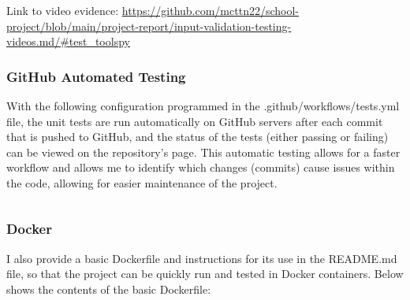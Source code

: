 \documentclass[./project-report/src/latex/project-report.tex]{subfiles}
\begin{document}
\begin{itemize}
\begin{itemize}
\begin{itemize}
						\pagebreak

						\begin{figure}[h!]
						\centering
						\end{figure}
	
						Link to video evidence: \url{https://github.com/mcttn22/school-project/blob/main/project-report/input-validation-testing-videos.md/#test_toolspy}
				\end{itemize}
        \end{itemize}
\end{itemize}

\subsubsection{GitHub Automated Testing}

With the following configuration programmed in the .github/workflows/tests.yml file, the unit tests are run automatically on GitHub servers after each commit that is pushed to GitHub, 
and the status of the tests (either passing or failing) can be viewed on the repository's page. This automatic testing allows for a faster workflow and allows me to identify which changes 
(commits) cause issues within the code, allowing for easier maintenance of the project.

\inputminted{yaml}{./.github/workflows/tests.yml}

\subsubsection{Docker}

I also provide a basic Dockerfile and instructions for its use in the README.md file, so that the project can be quickly run and tested in Docker containers. Below 
shows the contents of the basic Dockerfile:

\inputminted{docker}{./Dockerfile}
\end{document}
